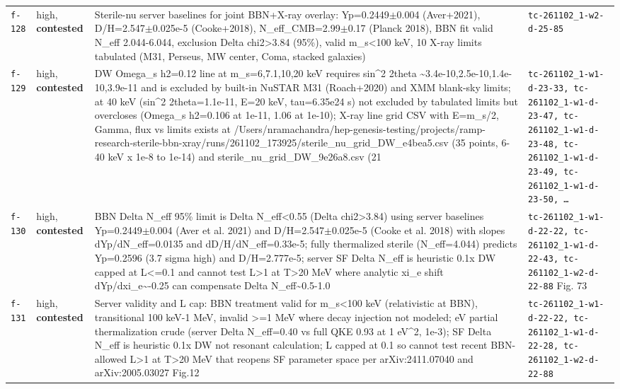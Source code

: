 \documentclass[11pt,a4paper]{article}
\begin{document}
\begin{longtable}{@{}p{}p{}p{}p{}@{}}
\texttt{f-128} & high, \textbf{contested} & Sterile-nu server baselines for joint BBN+X-ray overlay: Yp=0.2449$\pm$0.004 (Aver+2021), D/H=2.547$\pm$0.025e-5 (Cooke+2018), N\_eff\_CMB=2.99$\pm$0.17 (Planck 2018), BBN fit valid N\_eff 2.044-6.044, exclusion Delta chi2\textgreater{}3.84 (95\%), valid m\_s\textless{}100 keV, 10 X-ray limits tabulated (M31, Perseus, MW center, Coma, stacked galaxies) & \texttt{tc-261102\_\allowbreak{}1-w2-d-25-85} \\
\texttt{f-129} & high, \textbf{contested} & DW Omega\_s h2=0.12 line at m\_s=6,7.1,10,20 keV requires sin\textasciicircum{}2 2theta \textasciitilde{}3.4e-10,2.5e-10,1.4e-10,3.9e-11 and is excluded by built-in NuSTAR M31 (Roach+2020) and XMM blank-sky limits; at 40 keV (sin\textasciicircum{}2 2theta=1.1e-11, E=20 keV, tau=6.35e24 s) not excluded by tabulated limits but overcloses (Omega\_s h2=0.106 at 1e-11, 1.06 at 1e-10); X-ray line grid CSV with E=m\_s/2, Gamma, flux vs limits exists at /Users/nramachandra/hep-genesis-testing/projects/ramp-research-sterile-bbn-xray/runs/261102\_173925/sterile\_nu\_grid\_DW\_e4bea5.csv (35 points, 6-40 keV x 1e-8 to 1e-14) and sterile\_nu\_grid\_DW\_9e26a8.csv (21 & \texttt{tc-261102\_\allowbreak{}1-w1-d-23-33,\allowbreak{} tc-261102\_\allowbreak{}1-w1-d-23-47,\allowbreak{} tc-261102\_\allowbreak{}1-w1-d-23-48,\allowbreak{} tc-261102\_\allowbreak{}1-w1-d-23-49,\allowbreak{} tc-261102\_\allowbreak{}1-w1-d-23-50,\allowbreak{} \ldots{}\allowbreak{}} \\
\texttt{f-130} & high, \textbf{contested} & BBN Delta N\_eff 95\% limit is Delta N\_eff\textless{}0.55 (Delta chi2\textgreater{}3.84) using server baselines Yp=0.2449$\pm$0.004 (Aver et al. 2021) and D/H=2.547$\pm$0.025e-5 (Cooke et al. 2018) with slopes dYp/dN\_eff=0.0135 and dD/H/dN\_eff=0.33e-5; fully thermalized sterile (N\_eff=4.044) predicts Yp=0.2596 (3.7 sigma high) and D/H=2.777e-5; server SF Delta N\_eff is heuristic 0.1x DW capped at L\textless{}=0.1 and cannot test L\textgreater{}1 at T\textgreater{}20 MeV where analytic xi\_e shift dYp/dxi\_e\textasciitilde{}-0.25 can compensate Delta N\_eff\textasciitilde{}0.5-1.0 & \texttt{tc-261102\_\allowbreak{}1-w1-d-22-22,\allowbreak{} tc-261102\_\allowbreak{}1-w1-d-22-43,\allowbreak{} tc-261102\_\allowbreak{}1-w2-d-22-88} Fig. 73 \\
\texttt{f-131} & high, \textbf{contested} & Server validity and L cap: BBN treatment valid for m\_s\textless{}100 keV (relativistic at BBN), transitional 100 keV-1 MeV, invalid \textgreater{}=1 MeV where decay injection not modeled; eV partial thermalization crude (server Delta N\_eff=0.40 vs full QKE 0.93 at 1 eV\textasciicircum{}2, 1e-3); SF Delta N\_eff is heuristic 0.1x DW not resonant calculation; L capped at 0.1 so cannot test recent BBN-allowed L\textgreater{}1 at T\textgreater{}20 MeV that reopens SF parameter space per arXiv:2411.07040 and arXiv:2005.03027 Fig.12 & \texttt{tc-261102\_\allowbreak{}1-w1-d-22-22,\allowbreak{} tc-261102\_\allowbreak{}1-w1-d-22-28,\allowbreak{} tc-261102\_\allowbreak{}1-w2-d-22-88} \\

\end{longtable}
\end{document}
